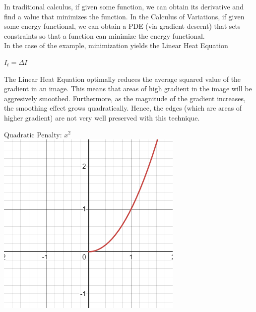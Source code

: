 \documentclass{article}
\begin{document}
  \noindent
  In traditional calculus, if given some function, we can obtain its derivative and find a value that minimizes the function.
  In the Calculus of Variations, if given some energy functional, we can obtain a PDE (via gradient descent) that 
  sets constraints so that a function can minimize the energy functional.\\

  \newpage
  \noindent
  In the case of the example, minimization yields the Linear Heat Equation
  \begin{center}
    $I_{t} = \Delta I$
  \end{center}
  The Linear Heat Equation optimally reduces the average squared value of the gradient in an image.
  This means that areas of high gradient in the image will be aggresively smoothed. Furthermore, as the
  magnitude of the gradient increases, the smoothing effect grows quadratically. Hence, the edges (which
  are areas of higher gradient) are not very well preserved with this technique.
  \begin{center}
    Quadratic Penalty: $x^2$\\
    \vspace{12pt}
    \includegraphics[scale=0.5]{../report_images/squared.png}
  \end{center}
  \vspace{12pt}
\end{document}
